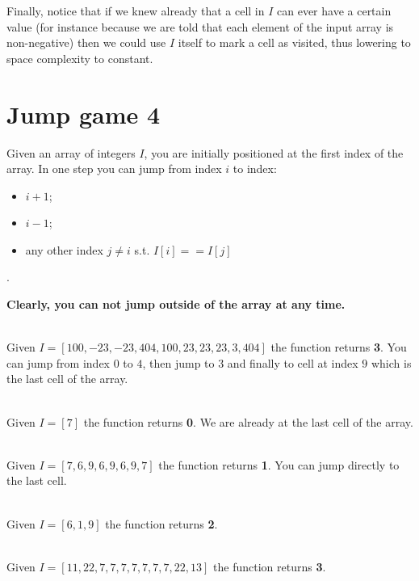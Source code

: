 Finally, notice that if we knew already that a cell in $I$ can ever have a certain value (for instance because we are told that each element of the input array is non-negative) then we could use $I$ itself to mark a cell as visited, thus lowering to space complexity to constant.



\section{Jump game 4}
\label{can_jump4:sec:statement}
\begin{exercise}
	Given an array of integers $I$, 
	you are initially positioned at the first index of the array.
	In one step you can jump from index $i$ to index:
	\begin{itemize}
		\item $i + 1$;
		\item $i-1$;
		\item any other index $j \neq i$ s.t. $I[i] == I[j]$
	\end{itemize}.
	
           
    \textbf{Clearly, you can not jump outside of the array at any time.}
    
    \begin{example}
        \hfill \\
        Given  $I=[100,-23,-23,404,100,23,23,23,3,404]$ the function returns \textbf{3}.
        You can jump from index $0$ to $4$, then jump to $3$ and finally to cell at index $9$ which is the last cell of the array.
        \label{ex:can_jump4_example1}
    \end{example}

	\begin{example}
        \hfill \\
        Given  $I=[7]$ the function returns \textbf{0}.
        We are already at the last cell of the array.
        \label{ex:can_jump4_example2}
    \end{example}

	\begin{example}
        \hfill \\
        Given  $I=[7,6,9,6,9,6,9,7]$ the function returns \textbf{1}.
        You can jump directly to the last cell.
        \label{ex:can_jump4_example3}
    \end{example}

	\begin{example}
        \hfill \\
        Given  $I=[6,1,9]$ the function returns \textbf{2}.
        \label{ex:can_jump4_example4}
    \end{example}

	\begin{example}
        \hfill \\
        Given  $I=[11,22,7,7,7,7,7,7,7,22,13]$ the function returns \textbf{3}.
        \label{ex:can_jump4_example5}
    \end{example}
\end{exercise}

